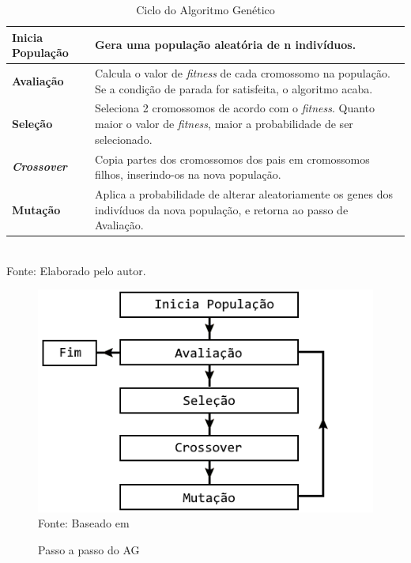 \documentclass[
	12pt,					%
	openright,				%
	oneside,				%
	a4paper,				%
	bibjustif,				%
	chapter=TITLE,			%
	english,				%
	brazil,					%
	]{abntex2}
\newcommand{\source}[1]{\small Fonte: {#1}}
\begin{document}
	\begin{table}[h]
		\caption{Ciclo do Algoritmo Genético}
		\centering
		\small
		\renewcommand{\arraystretch}{1.2} %
		\begin{tabular}{>{\centering\arraybackslash}m{3.5cm} m{11.5cm}}
			\hline 
			\textbf{Inicia População} & Gera uma população aleatória de n indivíduos. \\ 
			\hline 
			\textbf{Avaliação} & Calcula o valor de \textit{fitness} de cada cromossomo na população. Se a condição de parada for satisfeita, o algoritmo acaba. \\ 
			\hline 
			\textbf{Seleção} & Seleciona 2 cromossomos de acordo com o \textit{fitness}. Quanto maior o valor de \textit{fitness}, maior a probabilidade de ser selecionado. \\ 
			\hline 
			\textbf{\textit{Crossover}} & Copia partes dos cromossomos dos pais em cromossomos filhos, inserindo-os na nova população. \\ 
			\hline 
			\textbf{Mutação} & Aplica a probabilidade de alterar aleatoriamente os genes dos indivíduos da nova população, e retorna ao passo de Avaliação. \\ 
			\hline 
		\end{tabular}\\
		\vspace{3mm}
		\source{Elaborado pelo autor.}
		\label{tab:agCycle}
	\end{table}
	
	\begin{figure}[ht!]
		\centering
		\caption{Passo a passo do AG}
		\includegraphics[scale=0.7]{img/GeneticAlgorithmFlow.png}\\
		\vspace{0.5mm}
		\source{Baseado em }
		\label{fig:gaflow}
	\end{figure}
	
\end{document}

